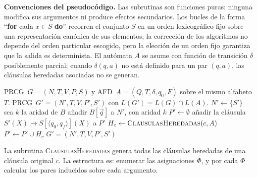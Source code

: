 \documentclass[11pt, letterpaper]{article}
\theoremstyle{definition}
\newcommand{\PRCG}{\mbox{PRCG}}
\newcommand{\AFD}{\mbox{AFD}}
\newcommand{\pair}[2]{\langle #1, #2 \rangle}
\newcommand{\trans}{\delta}
\begin{document}
\textbf{Convenciones del pseudocódigo.} Las subrutinas son funciones puras: ninguna modifica sus argumentos ni produce efectos secundarios. Los bucles de la forma ``\textbf{for} cada $x \in S$ \textbf{do}'' recorren el conjunto $S$ en un orden lexicográfico fijo sobre una representación canónica de sus elementos; la corrección de los algoritmos no depende del orden particular escogido, pero la elección de un orden fijo garantiza que la salida es determinista. El autómata $A$ se asume con función de transición $\trans$ posiblemente parcial; cuando $\trans(q, a)$ no está definido para un par $(q, a)$, las cláusulas heredadas asociadas no se generan.

\begin{algorithm}[H]
\caption{\textsc{ConstruirGPrima}($G, A$)}
\begin{algorithmic}[1]
\Require \PRCG\ $G = (N, T, V, P, S)$ y \AFD\ $A = (Q, T, \trans, q_0, F)$ sobre el mismo alfabeto $T$.
\Ensure  \PRCG\ $G' = (N', T, V, P', S')$ con $L(G') = L(G) \cap L(A)$.
\State {}
\State $N' \gets \{S'\}$
    \State sea $k$ la aridad de $B$
    \For{cada vector $\vec{q} = (\pair{p_1}{p'_1}, \dots, \pair{p_k}{p'_k}) \in (Q \times Q)^k$}
        \State añadir $B[\vec{q}]$ a $N'$, con aridad $k$
    \EndFor
\EndFor
\State {}
\State $P' \gets \emptyset$
    \State añadir la cláusula $S'(X) \to S[\pair{q_0}{q_f}](X)$ a $P'$
\EndFor
\State {}
    \State $H_c \gets \textsc{ClausulasHeredadas}(c, A)$
    \State $P' \gets P' \cup H_c$
\EndFor
\State \Return $G' = (N', T, V, P', S')$
\end{algorithmic}
\end{algorithm}

La subrutina \textsc{ClausulasHeredadas} genera todas las cláusulas heredadas de una cláusula original $c$. La estructura es: enumerar las asignaciones $\Phi$, y por cada $\Phi$ calcular los pares inducidos sobre cada argumento.
\end{document}
